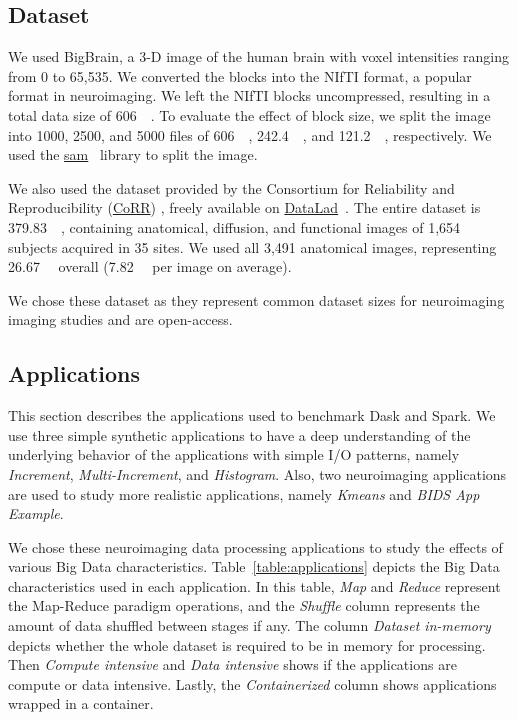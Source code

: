 \documentclass[AMA,STIX1COL]{WileyNJD-v2}
\newcommand{\HL}[1]{#1}
\begin{document}
\subsection{Dataset}
We used BigBrain\cite{Amunts:13}, a 3-D image of the human brain with voxel
intensities ranging from 0 to 65,535. We converted the blocks into the
NIfTI format, a popular format in neuroimaging. We left the NIfTI blocks
uncompressed, resulting in a total data size of \SI{606}{\gibi\byte}. To
evaluate the effect of block size, we split the image into 1000, 2500,
and 5000 files of \SI{606}{\mebi\byte}, \SI{242.4}{\mebi\byte}, and
\SI{121.2}{\mebi\byte}, respectively.
We used the \href{https://github.com/big-data-lab-team/sam}{sam}~{\cite{sam}} library to split the image.
							
We also used the dataset provided by the Consortium for Reliability and
Reproducibility
(\href{http://fcon_1000.projects.nitrc.org/indi/CoRR/html/}{CoRR})
\cite{zuo2014open}, freely available on
\href{https://datasets.datalad.org/?dir=/corr/RawDataBIDS}{DataLad}~{\cite{DataladDataset}}.
The entire dataset is \SI{379.83}{\gibi\byte}, containing anatomical, diffusion,
and functional images of 1,654 subjects acquired in 35 sites.
We used all 3,491 anatomical images, representing \SI{26.67}{\gibi\byte} overall
(\SI{7.82}{\mebi\byte} per image on average).

\HL{
	We chose these dataset as they represent common dataset sizes for neuroimaging 
	imaging studies and are open-access.
}
							
\subsection{Applications}
This section describes the applications used to benchmark Dask and Spark.
We use three simple synthetic applications to have a deep understanding of the 
underlying behavior of the applications with simple I/O patterns, namely
\textit{Increment}, \textit{Multi-Increment}, and \textit{Histogram}.
Also, two neuroimaging applications are used to study more realistic 
applications, namely \textit{Kmeans} and \textit{BIDS App Example}{\cite{gorgolewski2017bids}}.
\HL{
	We chose these neuroimaging data processing applications to study the 
	effects of various Big Data characteristics.
	Table~{\ref{table:applications}} depicts the Big Data characteristics used in
	each application. 
	In this table, \textit{Map} and \textit{Reduce} represent the Map-Reduce paradigm operations,
	and the \textit{Shuffle} column represents the amount of data shuffled between stages if any.
	The column \textit{Dataset in-memory} depicts whether the whole dataset is required to 
	be in memory for processing.
	Then \textit{Compute intensive} and \textit{Data intensive} shows if the applications are
	compute or data intensive.
	Lastly, the \textit{Containerized} column shows applications wrapped in a container.
}
\end{document}
